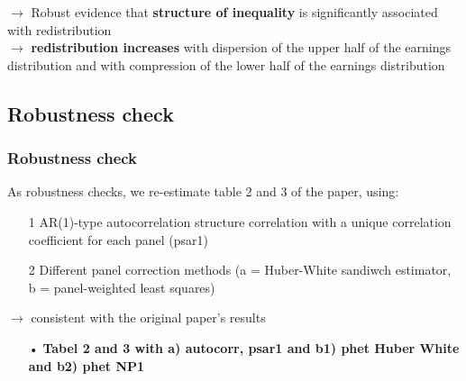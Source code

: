 \documentclass{beamer}
\begin{document}
\begin{frame}
\begin{itemize}
\begin{frame}
$\longrightarrow$  Robust evidence that \textbf{structure of inequality} is significantly associated with redistribution\\
\medskip
\medskip
$\longrightarrow$ \textbf{redistribution increases} with dispersion of the upper half of the earnings distribution and with compression of the lower half of the earnings distribution
\end{frame}


\begin{frame}
\subsection{Robustness check} 
\frametitle{Robustness check}
As robustness checks, we re-estimate table 2 and 3 of the paper, using:
\begin{itemize}
\item[1] AR(1)-type autocorrelation structure correlation with a unique correlation coefficient for each panel (psar1)
\item[2] Different panel correction methods (a = Huber-White sandiwch estimator, b = panel-weighted least squares) 
\end{itemize} 
\medskip
$\longrightarrow$  consistent with the original paper's results 
\medskip
\medskip
\begin{itemize} 
\item[•] \textbf{Tabel 2 and 3 with a) autocorr, psar1 and b1) phet Huber White and b2) phet NP1}
\end{itemize}
\end{frame}


\begin{frame}

\end{frame}
\end{itemize}
\end{frame}
\end{document}
